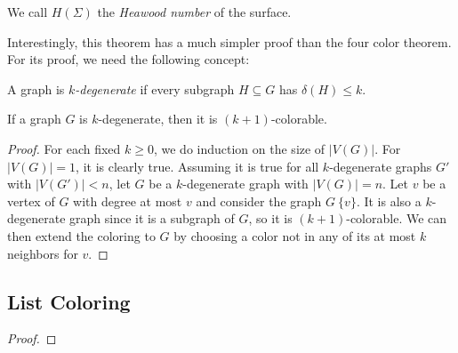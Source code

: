 We call $H(\Sigma)$ the \emph{Heawood number} of the surface.

Interestingly, this theorem has a much simpler proof than the four color theorem. For its proof, we need the following concept:


\begin{definition} A graph is $k$\emph{-degenerate} if every subgraph $H \subseteq G$ has $\delta(H) \leq k$.
\end{definition}

\begin{proposition}
If a graph $G$ is $k$-degenerate, then it is $(k+1)$-colorable.
\end{proposition}

\begin{proof}
For each fixed $k \geq 0$, we do induction on the size of $|V(G)|$. For $|V(G)| = 1$, it is clearly true. Assuming it is true for all $k$-degenerate graphs $G'$ with $|V(G')| < n$, let $G$ be a $k$-degenerate graph with $|V(G)| = n$. Let $v$ be a vertex of $G$ with degree at most $v$ and consider the graph $G \ \{v\}$. It is also a $k$-degenerate graph since it is a subgraph of $G$, so it is $(k+1)$-colorable. We can then extend the coloring to $G$ by choosing a color not in any of its at most $k$ neighbors for $v$.
\end{proof}





\subsection{List Coloring}



\cite{thomassenplanargraphchoosable}

\begin{theorem}
\label{thomassentheorem}
\end{theorem}

\begin{theorem}
\label{thomassenstrongertheorem}
\end{theorem}

\begin{proof}

\end{proof}

